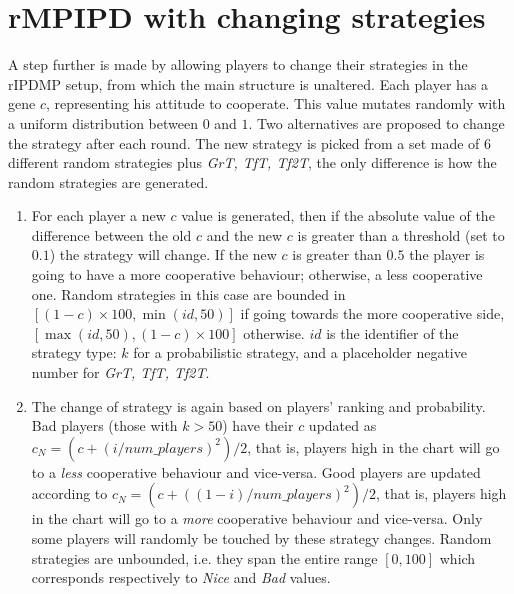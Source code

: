 \documentclass[journal,10pt,twoside]{IEEEtran}
\begin{document}
\section{rMPIPD with changing strategies} \label{s:crIPDMP}
A step further is made by allowing players to change their strategies in the rIPDMP setup, from which the main structure is unaltered.
Each player has a gene $c$, representing his attitude to cooperate. This value mutates randomly with a uniform distribution between $0$ and $1$.
Two alternatives are proposed to change the strategy after each round.
The new strategy is picked from a set made of $6$ different random strategies plus \textit{GrT, TfT, Tf2T}, the only difference is how the random strategies are generated.

\begin{enumerate}
    \item For each player a new $c$ value is generated, then if the absolute value of the difference between the old $c$ and the new $c$ is greater than a threshold (set to $0.1$) the strategy will change. If the new $c$ is greater than $0.5$ the player is going to have a more cooperative behaviour; otherwise, a less cooperative one.
	Random strategies in this case are bounded in 
	$[(1-c)\times 100, \min(id,50)]$ if going towards the more cooperative side, $[\max(id,50), (1-c)\times 100]$ otherwise. $id$ is the identifier of the strategy type: $k$ for a probabilistic strategy, and a placeholder negative number for \textit{GrT, TfT, Tf2T}.

	\item The change of strategy is again based on players' ranking and probability. Bad players (those with $k>50$) have their $c$ updated as
	$c_N = (c+(i/num\_players)^2)/2$, that is, players high in the chart will go to a \textit{less} cooperative behaviour and vice-versa.
	Good players are updated according to $c_N = (c+((1-i)/num\_players)^2)/2$, that is, players high in the chart will go to a \textit{more} cooperative behaviour and vice-versa.
	Only some players will randomly be touched by these strategy changes.
	Random strategies are unbounded, i.e. they span the entire range $[0,100]$ which corresponds respectively to \textit{Nice} and \textit{Bad} values.
\end{enumerate}
\end{document}
